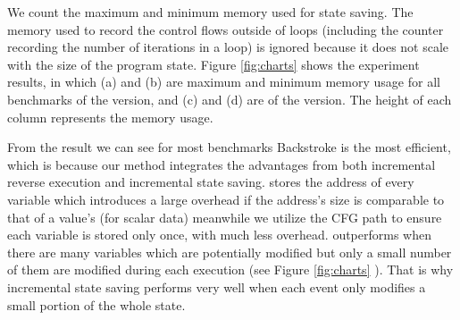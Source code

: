 We count the maximum and minimum memory used for state saving. 
The memory used to record the control flows outside of loops (including the counter recording the number of iterations in a loop) is ignored because it does not scale with the size of the program state. 
Figure \ref{fig:charts} shows the experiment results, in which (a) and (b) are maximum and minimum memory usage for all benchmarks of the \Asn version, and (c) and (d) are of the \Inc version. The height of each column represents the memory usage. 

From the result we can see for most benchmarks Backstroke is the most efficient, which is because our method integrates the advantages from both incremental reverse execution and incremental state saving. 
\ISS stores the address of every variable which introduces a large overhead if the address's size is comparable to that of a value's (for scalar data) meanwhile we utilize the CFG path to ensure each variable is stored only once, with much less overhead.
\ISS outperforms \CSS when there are many variables which are potentially modified but only a small number of them are modified during each execution (see Figure \ref{fig:charts} \Branchesb). That is why incremental state saving performs very well when each event only modifies a small portion of the whole state.


\newcommand{\FigSize}{320pt}

